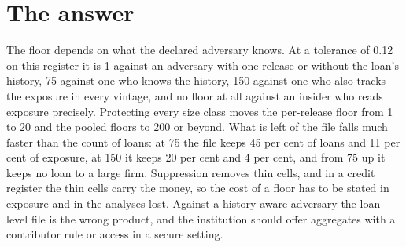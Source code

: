 \section{The answer}

The floor depends on what the declared adversary knows. At a tolerance of 0.12 on
this register it is 1 against an adversary with one release or without the loan's
history, 75 against one who knows the history, 150 against one who also tracks the
exposure in every vintage, and no floor at all against an insider who reads exposure
precisely. Protecting every size class moves the per-release floor from 1 to 20 and
the pooled floors to 200 or beyond. What is left of the file falls much faster than
the count of loans: at 75 the file keeps 45 per cent of loans and 11 per cent of
exposure, at 150 it keeps 20 per cent and 4 per cent, and from 75 up it keeps no loan
to a large firm. Suppression removes thin cells, and in a credit register the thin
cells carry the money, so the cost of a floor has to be stated in exposure and in the
analyses lost. Against a history-aware adversary the loan-level file is the wrong
product, and the institution should offer aggregates with a contributor rule or
access in a secure setting.

